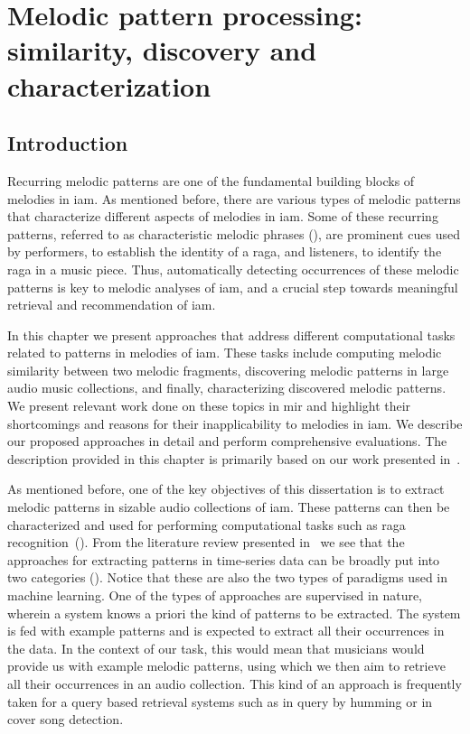 
\chapter{Melodic pattern processing: similarity, discovery and characterization}
\label{chap:melodic_pattern_processing}

\section{Introduction}
\label{sec:patterns_introduction}

Recurring melodic patterns are one of the fundamental building blocks of melodies in \gls{iam}. As mentioned before, there are various types of melodic patterns that characterize different aspects of melodies in \gls{iam}. Some of these recurring patterns, referred to as characteristic melodic phrases (), are prominent cues used by performers, to establish the identity of a \gls{raga}, and listeners, to identify the \gls{raga} in a music piece. Thus, automatically detecting occurrences of these melodic patterns is key to melodic analyses of \gls{iam}, and a crucial step towards meaningful retrieval and recommendation of \gls{iam}.

In this chapter we present approaches that address different computational tasks related to patterns in melodies of \gls{iam}. These tasks include computing melodic similarity between two melodic fragments, discovering melodic patterns in large audio music collections, and finally, characterizing discovered melodic patterns. We present relevant work done on these topics in \gls{mir} and highlight their shortcomings and reasons for their inapplicability to melodies in \gls{iam}. We describe our proposed approaches in detail and perform comprehensive evaluations. The description provided in this chapter is primarily based on our work presented in~\cite{gulati_SITIS_2014,gulati_ICASSP2015, gulati_ISMIR_2015,gulati_communities_2016}.

As mentioned before, one of the key objectives of this dissertation is to extract melodic patterns in sizable audio collections of \gls{iam}. These patterns can then be characterized and used for performing computational tasks such as \gls{raga} recognition~(). From the literature review presented in~ we see that the approaches for extracting patterns in time-series data can be broadly put into two categories (). Notice that these are also the two types of paradigms used in machine learning. One of the types of approaches are supervised in nature, wherein a system knows a priori the kind of patterns to be extracted. The system is fed with example patterns and is expected to extract all their occurrences in the data. In the context of our task, this would mean that musicians would provide us with example melodic patterns, using which we then aim to retrieve all their occurrences in an audio collection. This kind of an approach is frequently taken for a query based retrieval systems such as in query by humming or in cover song detection. 


